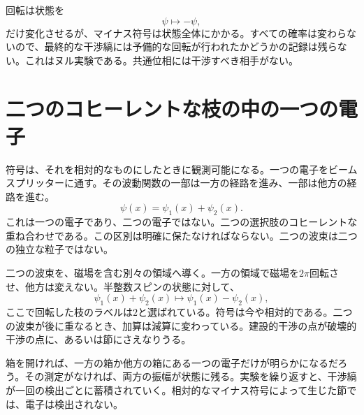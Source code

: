 回転は状態を
\begin{equation}
\psi\longmapsto-\psi,
\end{equation}
だけ変化させるが、マイナス符号は状態全体にかかる。すべての確率は変わらないので、最終的な干渉縞には予備的な回転が行われたかどうかの記録は残らない。これはヌル実験である。共通位相には干渉すべき相手がない。

\begin{classroomqa}
\end{classroomqa}

\section{二つのコヒーレントな枝の中の一つの電子}

符号は、それを相対的なものにしたときに観測可能になる。一つの電子をビームスプリッターに通す。その波動関数の一部は一方の経路を進み、一部は他方の経路を進む。
\begin{equation}
\psi(x)=\psi_1(x)+\psi_2(x).
\end{equation}
これは一つの電子であり、二つの電子ではない。二つの選択肢のコヒーレントな重ね合わせである。この区別は明確に保たなければならない。二つの波束は二つの独立な粒子ではない。

二つの波束を、磁場を含む別々の領域へ導く。一方の領域で磁場を\(2\pi\)回転させ、他方は変えない。半整数スピンの状態に対して、
\begin{equation}
\psi_1(x)+\psi_2(x)
\longmapsto
\psi_1(x)-\psi_2(x),
\end{equation}
ここで回転した枝のラベルは\(2\)と選ばれている。符号は今や相対的である。二つの波束が後に重なるとき、加算は減算に変わっている。建設的干渉の点が破壊的干渉の点に、あるいは節にさえなりうる。

\begin{classroomqa}
\end{classroomqa}

箱を開ければ、一方の箱か他方の箱にある一つの電子だけが明らかになるだろう。その測定がなければ、両方の振幅が状態に残る。実験を繰り返すと、干渉縞が一回の検出ごとに蓄積されていく。相対的なマイナス符号によって生じた節では、電子は検出されない。

